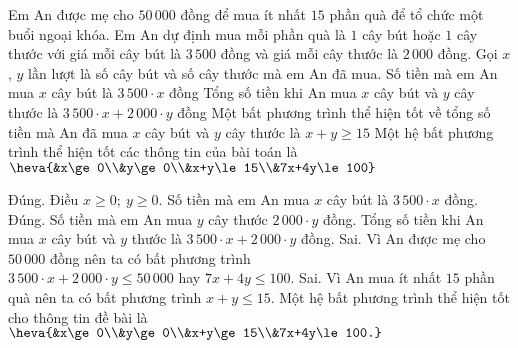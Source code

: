 \begin{ex}%
	Em An được mẹ cho $50 \, 000$ đồng để mua ít nhất $15$ phần quà để tổ chức một buổi ngoại khóa. Em An dự định mua mỗi phần quà là $1$ cây bút hoặc $1$ cây thước với giá mỗi cây bút là $3\, 500$ đồng và giá mỗi cây thước là $2\, 000$ đồng. Gọi $x$, $y$ lần lượt là số cây bút và số cây thước mà em An đã mua.
	\choiceTF
	{\True Số tiền mà em An mua $x$ cây bút là $3\, 500\cdot x$ đồng}
	{\True Tổng số tiền khi An mua $x$ cây bút và $y$ cây thước là $3\, 500\cdot x+2\, 000\cdot y$ đồng}
	{Một bất phương trình thể hiện tốt về tổng số tiền mà An đã mua $x$ cây bút và $y$ cây thước là $x+y\ge 15$}
	{ Một hệ bất phương trình thể hiện tốt các thông tin của bài toán là $\heva{&x\ge 0\\&y\ge 0\\&x+y\le 15\\&7x+4y\le 100}$}
	\loigiai
	{
		\begin{itemchoice}
			\itemch Đúng. Điều $x\ge 0;\ y\ge 0$. Số tiền mà em An mua $x$ cây bút là $3\, 500\cdot x$ đồng. 
			\itemch Đúng. Số tiền mà em An mua $y$ cây thước $2\, 000\cdot y$ đồng. Tổng số tiền khi An mua $x$ cây bút và $y$ thước là $3\, 500\cdot x+2\, 000\cdot y$ đồng. 
			\itemch Sai. Vì An được mẹ cho $50\, 000$ đồng nên ta có bất phương trình \\
			$3\, 500\cdot x+2\, 000\cdot y\le 50\, 000$ hay $7x+4y\le 100$.
			\itemch Sai. Vì An mua ít nhất $15$ phần quà nên ta có bất phương trình $x+y\le 15$. Một hệ bất phương trình thể hiện tốt cho thông tin đề bài là $\heva{&x\ge 0\\&y\ge 0\\&x+y\ge 15\\&7x+4y\le 100.}$
		\end{itemchoice}
	}
\end{ex}
